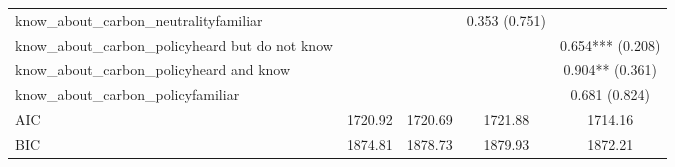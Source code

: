 \begin{table}[!htbp]
\begin{tabular}{lcccc}
know\_about\_carbon\_neutralityfamiliar &  &  & 0.353 (0.751) &  \\
know\_about\_carbon\_policyheard but do not know &  &  &  & 0.654*** (0.208) \\
know\_about\_carbon\_policyheard and know &  &  &  & 0.904** (0.361) \\
know\_about\_carbon\_policyfamiliar &  &  &  & 0.681 (0.824) \\
AIC & 1720.92 & 1720.69 & 1721.88 & 1714.16 \\
BIC & 1874.81 & 1878.73 & 1879.93 & 1872.21 \\
\hline
\end{tabular}
\end{table}
